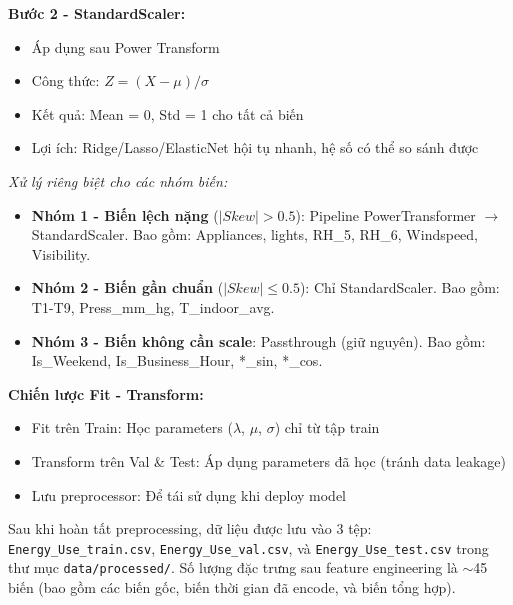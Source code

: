 \textbf{Bước 2 - StandardScaler:}
\begin{itemize} [labelsep=10pt, leftmargin=2cm]
    \item Áp dụng sau Power Transform
    \item Công thức: $Z = (X - \mu) / \sigma$
    \item Kết quả: Mean = 0, Std = 1 cho tất cả biến
    \item Lợi ích: Ridge/Lasso/ElasticNet hội tụ nhanh, hệ số có thể so sánh được
\end{itemize}

\textit{Xử lý riêng biệt cho các nhóm biến:}

\begin{itemize} [labelsep=10pt, leftmargin=2cm]
    \item \textbf{Nhóm 1 - Biến lệch nặng} ($|Skew| > 0.5$): Pipeline PowerTransformer $\rightarrow$ StandardScaler. Bao gồm: Appliances, lights, RH\_5, RH\_6, Windspeed, Visibility.
    
    \item \textbf{Nhóm 2 - Biến gần chuẩn} ($|Skew| \leq 0.5$): Chỉ StandardScaler. Bao gồm: T1-T9, Press\_mm\_hg, T\_indoor\_avg.
    
    \item \textbf{Nhóm 3 - Biến không cần scale}: Passthrough (giữ nguyên). Bao gồm: Is\_Weekend, Is\_Business\_Hour, *\_sin, *\_cos.
\end{itemize}

\textbf{Chiến lược Fit - Transform:}
\begin{itemize} [labelsep=10pt, leftmargin=2cm]
    \item Fit trên Train: Học parameters ($\lambda$, $\mu$, $\sigma$) chỉ từ tập train
    \item Transform trên Val \& Test: Áp dụng parameters đã học (tránh data leakage)
    \item Lưu preprocessor: Để tái sử dụng khi deploy model
\end{itemize}

Sau khi hoàn tất preprocessing, dữ liệu được lưu vào 3 tệp: \texttt{Energy\_Use\_train.csv}, \texttt{Energy\_Use\_val.csv}, và \texttt{Energy\_Use\_test.csv} trong thư mục \texttt{data/processed/}. Số lượng đặc trưng sau feature engineering là $\sim$45 biến (bao gồm các biến gốc, biến thời gian đã encode, và biến tổng hợp).

